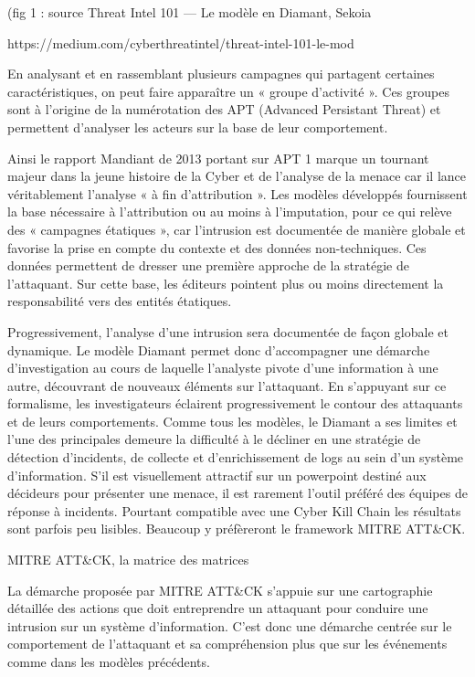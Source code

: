 (fig 1 : source Threat Intel 101 — Le modèle en Diamant, Sekoia

https://medium.com/cyberthreatintel/threat-intel-101-le-mod%

En analysant et en rassemblant plusieurs campagnes qui partagent certaines caractéristiques, on peut faire apparaître un « groupe d’activité ». Ces groupes sont à l’origine de la numérotation des APT (Advanced Persistant Threat) et permettent d’analyser les acteurs sur la base de leur comportement. 

Ainsi le rapport Mandiant de 2013 portant sur APT 1 marque un tournant majeur dans la jeune histoire de la Cyber et de l’analyse de la menace car il lance véritablement l’analyse « à fin d’attribution ». Les modèles développés fournissent la base nécessaire à l’attribution ou au moins à l’imputation, pour ce qui relève des « campagnes étatiques », car l’intrusion est documentée de manière globale et favorise la prise en compte du contexte et des données non-techniques. Ces données permettent de dresser une première approche de la stratégie de l’attaquant. Sur cette base, les éditeurs pointent plus ou moins directement la responsabilité vers des entités étatiques. 

Progressivement, l’analyse d’une intrusion sera documentée de façon globale et dynamique. Le modèle Diamant permet donc d’accompagner une démarche d’investigation au cours de laquelle l’analyste pivote d’une information à une autre, découvrant de nouveaux éléments sur l’attaquant. En s’appuyant sur ce formalisme, les investigateurs éclairent progressivement le contour des attaquants et de leurs comportements. Comme tous les modèles, le Diamant a ses limites et l’une des principales demeure la difficulté à le décliner en une stratégie de détection d’incidents, de collecte et d’enrichissement de logs au sein d’un système d’information. S’il est visuellement attractif sur un powerpoint destiné aux décideurs pour présenter une menace, il est rarement l’outil préféré des équipes de réponse à incidents. Pourtant compatible avec une Cyber Kill Chain les résultats sont parfois peu lisibles. Beaucoup y préfèreront le framework MITRE ATT&CK.

MITRE ATT&CK, la matrice des matrices

La démarche proposée par MITRE ATT&CK s’appuie sur une cartographie détaillée des actions que doit entreprendre un attaquant pour conduire une intrusion sur un système d’information. C’est donc une démarche centrée sur le comportement de l’attaquant et sa compréhension plus que sur les événements comme dans les modèles précédents.

